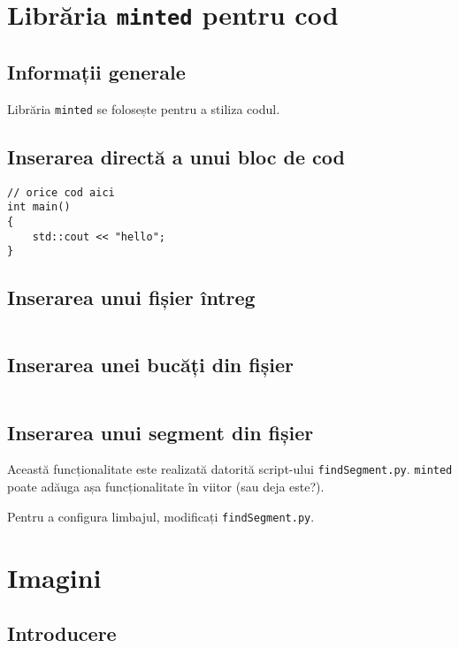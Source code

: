 \documentclass[a4paper,12pt]{report}
\begin{document}
\section{Librăria \texttt{minted} pentru cod}

\subsection{Informații generale}

Librăria \texttt{minted} se folosește pentru a stiliza codul.

\subsection{Inserarea directă a unui bloc de cod}

\begin{verbatim}
// orice cod aici
int main()
{
    std::cout << "hello";
}
\end{verbatim}

\subsection{Inserarea unui fișier întreg}

\inputminted[]{zig}{../src/sourcefile.zig}

\subsection{Inserarea unei bucăți din fișier}

\inputminted[firstline=2,lastline=5]{zig}{../src/sourcefile.zig}

\subsection{Inserarea unui segment din fișier}

Această funcționalitate este realizată datorită script-ului \texttt{findSegment.py}.
\texttt{minted} poate adăuga așa funcționalitate în viitor (sau deja este?).

Pentru a configura limbajul, modificați \texttt{findSegment.py}.


\section{Imagini}

\subsection{Introducere}
\end{document}
